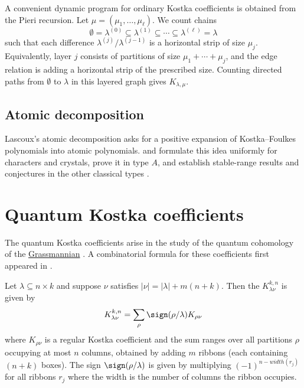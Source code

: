A convenient dynamic program for ordinary Kostka coefficients is obtained from
the Pieri recursion.  Let $\mu=(\mu_1,\dotsc,\mu_\ell)$.  We count chains
\[
\emptyset=\lambda^{(0)}\subseteq \lambda^{(1)}\subseteq \dotsb
\subseteq \lambda^{(\ell)}=\lambda
\]
such that each difference $\lambda^{(j)}/\lambda^{(j-1)}$ is a horizontal
strip of size $\mu_j$.  Equivalently, layer $j$ consists of partitions of size
$\mu_1+\dotsb+\mu_j$, and the edge relation is adding a horizontal strip of the
prescribed size.  Counting directed paths from $\emptyset$ to $\lambda$ in this
layered graph gives $K_{\lambda,\mu}$.


\subsection[kostkaFoulkesAtoms]{Atomic decomposition}

Lascoux's atomic decomposition asks for a positive expansion of
Kostka--Foulkes polynomials into atomic polynomials.  
and  formulate this idea uniformly for characters and
crystals, prove it in type $A$, and establish stable-range results and
conjectures in the other classical types \cite{LecouveyLenart2021}.



\section[quantumKostka]{Quantum Kostka coefficients}

The quantum Kostka coefficients arise in the study of the quantum cohomology
of the \hyperref[grassmannianVarieties]{Grassmannian}
\cite{PetrovicRadovanovic2016}.
A combinatorial formula for these coefficients first appeared in \cite{BertramCiocanFontanineFulton1999}.

Let $\lambda \subseteq n \times k$ and suppose $\nu$ satisfies
$|\nu| = |\lambda| + m(n+k)$. Then the
\label{quantumKostkaCoefficient}
$K_{\lambda \nu}^{k,n}$
is given by
\[
K_{\lambda \nu}^{k,n} = \sum_{\rho} \sign(\rho/\lambda) K_{\rho \nu}
\]
where $K_{\rho \nu}$ is a regular Kostka coefficient and the sum ranges over
all partitions $\rho$ occupying at most $n$ columns,
obtained by adding $m$ ribbons (each containing $(n+k)$ boxes).
The sign $\sign(\rho/\lambda)$ is given by multiplying $(-1)^{n-width(r_j)}$
for all ribbons $r_j$ where the width is the number of columns the ribbon occupies.



